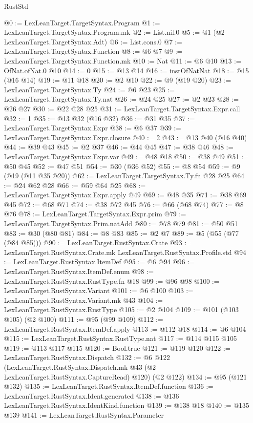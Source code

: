 \begin{lexlean}{RustStd}
\begin{coremodule}
@0 := LexLeanTarget.TargetSyntax.Program
@1 := LexLeanTarget.TargetSyntax.Program.mk
@2 := List.nil.{0}
@5 := @1 (@2 LexLeanTarget.TargetSyntax.Adt)
@6 := List.cons.{0}
@7 := LexLeanTarget.TargetSyntax.Function
@8 := @6 @7
@9 := LexLeanTarget.TargetSyntax.Function.mk
@10 := Nat
@11 := @6 @10
@13 := OfNat.ofNat.{0} @10
@14 := 0
@15 := @13 @14
@16 := instOfNatNat
@18 := @15 (@16 @14)
@19 := @11 @18
@20 := @2 @10
@22 := @9 (@19 @20)
@23 := LexLeanTarget.TargetSyntax.Ty
@24 := @6 @23
@25 := LexLeanTarget.TargetSyntax.Ty.nat
@26 := @24 @25
@27 := @2 @23
@28 := @26 @27
@30 := @22 @28 @25
@31 := LexLeanTarget.TargetSyntax.Expr.call
@32 := 1
@35 := @13 @32 (@16 @32)
@36 := @31 @35
@37 := LexLeanTarget.TargetSyntax.Expr
@38 := @6 @37
@39 := LexLeanTarget.TargetSyntax.Expr.closure
@40 := 2
@43 := @13 @40 (@16 @40)
@44 := @39 @43
@45 := @2 @37
@46 := @44 @45
@47 := @38 @46
@48 := LexLeanTarget.TargetSyntax.Expr.var
@49 := @48 @18
@50 := @38 @49
@51 := @50 @45
@52 := @47 @51
@54 := @30 (@36 @52)
@55 := @8 @54
@59 := @9 (@19 (@11 @35 @20))
@62 := LexLeanTarget.TargetSyntax.Ty.fn @28 @25
@64 := @24 @62 @28
@66 := @59 @64 @25
@68 := LexLeanTarget.TargetSyntax.Expr.apply @49
@69 := @48 @35
@71 := @38 @69 @45
@72 := @68 @71
@74 := @38 @72 @45
@76 := @66 (@68 @74)
@77 := @8 @76
@78 := LexLeanTarget.TargetSyntax.Expr.prim
@79 := LexLeanTarget.TargetSyntax.Prim.natAdd
@80 := @78 @79
@81 := @50 @51
@83 := @30 (@80 @81)
@84 := @8 @83
@85 := @2 @7
@89 := @5 (@55 (@77 (@84 @85)))
@90 := LexLeanTarget.RustSyntax.Crate
@93 := LexLeanTarget.RustSyntax.Crate.mk LexLeanTarget.RustSyntax.Profile.std
@94 := LexLeanTarget.RustSyntax.ItemDef
@95 := @6 @94
@96 := LexLeanTarget.RustSyntax.ItemDef.enum
@98 := LexLeanTarget.RustSyntax.RustType.fn @18
@99 := @96 @98
@100 := LexLeanTarget.RustSyntax.Variant
@101 := @6 @100
@103 := LexLeanTarget.RustSyntax.Variant.mk @43
@104 := LexLeanTarget.RustSyntax.RustType
@105 := @2 @104
@109 := @101 (@103 @105) (@2 @100)
@111 := @95 (@99 @109)
@112 := LexLeanTarget.RustSyntax.ItemDef.apply
@113 := @112 @18
@114 := @6 @104
@115 := LexLeanTarget.RustSyntax.RustType.nat
@117 := @114 @115 @105
@119 := @113 @117 @115
@120 := Bool.true
@121 := @119 @120
@122 := LexLeanTarget.RustSyntax.Dispatch
@132 := @6
    @122
    (LexLeanTarget.RustSyntax.Dispatch.mk @43 (@2 LexLeanTarget.RustSyntax.CaptureRead) @120)
    (@2 @122)
@134 := @95 (@121 @132)
@135 := LexLeanTarget.RustSyntax.ItemDef.function
@136 := LexLeanTarget.RustSyntax.Ident.generated
@138 := @136 LexLeanTarget.RustSyntax.IdentKind.function
@139 := @138 @18
@140 := @135 @139
@141 := LexLeanTarget.RustSyntax.Parameter

\end{coremodule}
\end{lexlean}
